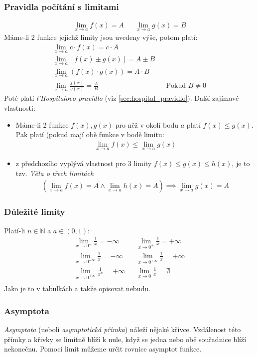 \documentclass[12pt]{article}
\newcommand{\nN}{\mathbb{N}} %
\begin{document}
\subsubsection{Pravidla počítání s limitami}
\begin{align}
 \lim _{x\to a} f(x) = A &&  \lim _{x\to a} g(x) = B 
\end{align}
Máme-li 2 funkce jejichž limity jsou uvedeny výše, potom platí:
\begin{align}
 \lim _{x\to a}c \cdot f(x)=c \cdot A\\
 \lim _{x\to a}[f(x)\pm g(x)]=A\pm B\\
 \lim _{x\to a}\left( f(x) \cdot g(x) \right)=A \cdot B\\
\lim _{x\to a}{\frac {f(x)}{g(x)}}={\frac {A}{B}} && \text{Pokud $B \neq 0$}
\end{align}
Poté platí \emph{l'Hospitalovo pravidlo} (viz \ref{sec:hospital_pravidlo}). Další zajímavé vlastnosti:
\begin{itemize}
\item Máme-li 2 funkce $f(x),g(x)$ pro něž v okolí bodu $a$ platí $f(x) \leq g(x)$. Pak platí (pokud mají obě funkce v bodě limitu:
\begin{align}
\lim _{x\to a}f(x)\leq \lim _{x\to a}g(x)
\end{align}
\item z předchozího vyplývá vlastnost pro 3 limity $ f(x)\leq g(x)\leq h(x)$, je to tzv. \emph{Věta o třech limitách}
\begin{align}
\left(  \lim _{x\to a}f(x)=A \land \lim _{x\to a}h(x)=A \right) \implies  \lim _{x\to a}g(x)=A 
\end{align}
\end{itemize}
\subsubsection{Důležité limity}
Platí-li $n \in \nN$ a $a \in (0,1)$:
\begin{align}
\lim_{x \to 0^-} \frac{1}{x} = - \infty && \lim_{x \to 0^+} \frac{1}{x} = + \infty \\
\lim_{x \to 0^{-\infty}} \frac{1}{x} = - \infty && \lim_{x \to 0^{+ \infty}} \frac{1}{x} = + \infty \\
\lim_{x \to 0^{+ \infty}} \frac{1}{x^n} = + \infty && \lim_{x \to 0} \frac{1}{x} = \nexists\\
\end{align}
Jako je to v tabulkách a takže opisovat nebudu.
\subsubsection{Asymptota}
\emph{Asymptota} (neboli \emph{asymptotická přímka}) náleží nějaké křivce.  Vzdálenost této přímky a křivky se limitně blíží k nule, když se jedna nebo obě souřadnice blíží nekonečnu. Pomocí limit můžeme určit rovnice asymptot funkce. \\
\end{document}
